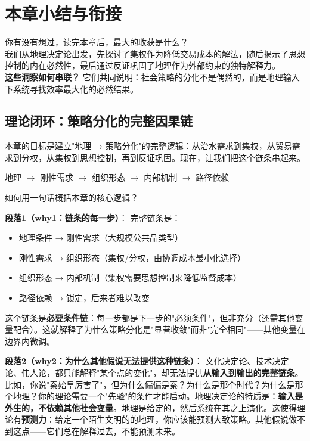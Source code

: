 \documentclass[../main.tex]{subfiles}
\begin{document}
	\section{本章小结与衔接}
	
	\begin{readingnote}
		你有没有想过，读完本章后，最大的收获是什么？\\
	我们从地理决定论出发，先探讨了集权作为降低交易成本的解法，随后揭示了思想控制的内在必然性，最后通过反证巩固了地理作为外部约束的独特解释力。\\
	\textbf{这些洞察如何串联？} 它们共同说明：社会策略的分化不是偶然的，而是地理输入下系统寻找效率最大化的必然结果。
	\end{readingnote}
	
	\subsection{理论闭环：策略分化的完整因果链}
	
	\begin{motivation}
		本章的目标是建立"地理 → 策略分化"的完整逻辑：从治水需求到集权，从贸易需求到分权，从集权到思想控制，再到反证巩固。现在，让我们把这个链条串起来。
	\end{motivation}
	
	\begin{logicmap}
		地理 $\rightarrow$ 刚性需求 $\rightarrow$ 组织形态 $\rightarrow$ 内部机制 $\rightarrow$ 路径依赖
	\end{logicmap}
	
	\begin{questionbox}
		如何用一句话概括本章的核心逻辑？
	\end{questionbox}
	
	\textbf{段落1（why1：链条的每一步）}：  
	完整链条是：  
    \begin{itemize}
      \item 地理条件 → 刚性需求（大规模公共品类型）  
      \item 刚性需求 → 组织形态（集权/分权，由协调成本最小化选择）  
      \item 组织形态 → 内部机制（集权需要思想控制来降低监督成本）  
      \item 路径依赖 → 锁定，后来者难以改变  
    \end{itemize}
    这个链条是\textbf{必要条件链}：每一步都是下一步的"必须条件"，但非充分（还需其他变量配合）。这就解释了为什么策略分化是"显著收敛"而非"完全相同"——其他变量在边界内微调。
	
	\textbf{段落2（why2：为什么其他假说无法提供这种链条）}：  
    文化决定论、技术决定论、伟人论，都只能解释"某个点的变化"，却无法提供\textbf{从输入到输出的完整链条}。比如，你说"秦始皇厉害了"，但为什么偏偏是秦？为什么是那个时代？为什么是那个地理？你的理论需要一个"先验"的条件才能启动。地理决定论的特质是：\textbf{输入是外生的，不依赖其他社会变量}。地理是给定的，然后系统在其之上演化。这使得理论有\textbf{预测力}：给定一个陌生文明的的地理，你应该能预测大致策略。其他假说做不到这点——它们总在解释过去，不能预测未来。
	
\end{document}
